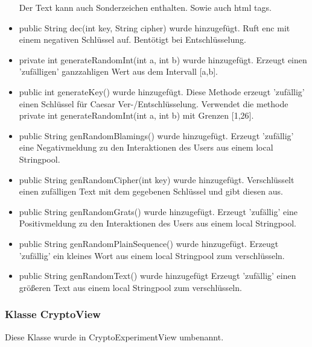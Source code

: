 \documentclass{article}
\begin{document}
\begin{itemize}
                   Der Text kann auch Sonderzeichen enthalten. Sowie auch html tags.
             \item public String dec(int key, String cipher) wurde hinzugefügt.\newline
                   Ruft enc mit einem negativen Schlüssel auf. Bentötigt bei Entschlüsselung.
             \item private int generateRandomInt(int a, int b) wurde hinzugefügt.\newline
                   Erzeugt einen 'zufälligen' ganzzahligen Wert aus dem Intervall [a,b].
             \item public int generateKey() wurde hinzugefügt.\newline
                   Diese Methode erzeugt 'zufällig' einen Schlüssel für Caesar Ver-/Entschlüsselung.
                   Verwendet die methode private int generateRandomInt(int a, int b) mit Grenzen [1,26].
             \item public String genRandomBlamings() wurde hinzugefügt.\newline
                   Erzeugt 'zufällig' eine Negativmeldung zu den Interaktionen des Users
                   aus einem local Stringpool.  
             \item public String genRandomCipher(int key) wurde hinzugefügt.\newline
                   Verschlüsselt einen zufälligen Text mit dem gegebenen Schlüssel 
                   und gibt diesen aus.
             \item public String genRandomGrats() wurde hinzugefügt.\newline
                   Erzeugt 'zufällig' eine Positivmeldung zu den Interaktionen des Users
                   aus einem local Stringpool. 
             \item public String genRandomPlainSequence() wurde hinzugefügt.\newline
                   Erzeugt 'zufällig' ein kleines Wort aus einem local Stringpool zum verschlüsseln. 
             \item public String genRandomText() wurde hinzugefügt\newline
                   Erzeugt 'zufällig' einen größeren Text aus einem local Stringpool zum verschlüsseln.      
            \end{itemize}

	\subsubsection{Klasse CryptoView}
	 Diese Klasse wurde in CryptoExperimentView umbenannt.\newline
	 
\end{document}
